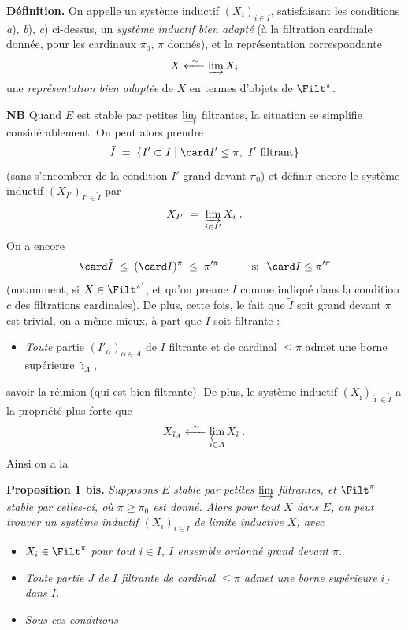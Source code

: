 \textbf{Définition.} On appelle un système inductif $(X_i)_{i\in I}$, satisfaisant les conditions \textit{a}), \textit{b}), \textit{c}) ci-dessus, un \textit{système inductif bien adapté} (à la filtration cardinale donnée, pour les cardinaux $\pi_0$, $\pi$ donnés), et la représentation correspondante
\[
X \xleftarrow{\ \sim\ } \varinjlim X_i
\]
une \textit{représentation bien adaptée} de $X$ en termes d'objets de $\Filt^\pi$.

\textbf{NB} Quand $E$ est stable par petites $\varinjlim$ filtrantes, la situation se simplifie considérablement. On peut alors prendre
\[
\tilde I \;=\; \{I'\subset I \mid \card I'\le\pi,\ I' \text{ filtrant}\}
\]
(sans s'encombrer de la condition $I'$ grand devant $\pi_0$) et définir encore le système inductif $(X_{I'})_{I'\in\tilde I}$ par
\[
X_{I'} \;=\; \varinjlim_{i\in I'} X_i \;.
\]
On a encore
\[
\card\tilde I \;\le\; (\card I)^\pi \;\le\; \pi'^{\pi} \qquad\quad \text{si }\ \card I\le\pi'^{\pi}
\]
(notamment, si $X\in\Filt^{\pi'}$, et qu'on prenne $I$ comme indiqué dans la condition $c$ des filtrations cardinales). De plus, cette fois, le fait que $\tilde I$ soit grand devant $\pi$ est trivial, on a même mieux, à part que $I$ soit filtrante :

\begin{itemize}
\item[$(*)$] \textit{Toute} partie $(I'_\alpha)_{\alpha\in A}$ de $\tilde I$ filtrante et de cardinal $\le\pi$ admet une borne supérieure $\tilde\imath_A$,
\end{itemize}

savoir la réunion (qui est bien filtrante). De plus, le système inductif $(X_{\tilde\imath})_{\tilde\imath\in\tilde I}$ a la propriété plus forte que
\[
X_{\tilde\imath_A} \xleftarrow{\ \sim\ } \varprojlim_{\tilde\imath\in A} X_{\tilde\imath} \;. %
\]
Ainsi on a la

\textbf{Proposition 1 bis.} \textit{Supposons $E$ stable par petites $\varinjlim$ filtrantes, et} $\Filt^\pi$ \textit{stable par celles-ci, où $\pi\ge\pi_0$ est donné. Alors pour tout $X$ dans $E$, on peut trouver un système inductif $(X_i)_{i\in I}$ de limite inductive $X$, avec}

\begin{itemize}
\item[a)] $X_i\in\Filt^\pi$ \textit{pour tout $i\in I$, $I$ ensemble ordonné grand devant $\pi$.}
\item[b)] \textit{Toute partie $J$ de $I$ filtrante de cardinal $\le\pi$ admet une borne supérieure $i_J$ dans $I$.}
\item[c)] \textit{Sous ces conditions}
\end{itemize}

